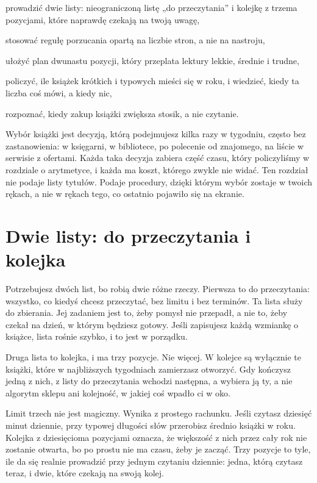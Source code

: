 
\begin{cele}
  \item prowadzić dwie listy: nieograniczoną listę „do przeczytania” i kolejkę z trzema pozycjami, które naprawdę czekają na twoją uwagę,
  \item stosować regułę porzucania opartą na liczbie stron, a nie na nastroju,
  \item ułożyć plan dwunastu pozycji, który przeplata lektury lekkie, średnie i trudne,
  \item policzyć, ile książek krótkich i typowych mieści się w roku, i wiedzieć, kiedy ta liczba coś mówi, a kiedy nic,
  \item rozpoznać, kiedy zakup książki zwiększa stosik, a nie czytanie.
\end{cele}

Wybór książki jest decyzją, którą podejmujesz kilka razy w tygodniu, często bez zastanowienia: w księgarni, w bibliotece, po polecenie od znajomego, na liście w serwisie z ofertami. Każda taka decyzja zabiera część czasu, który policzyliśmy w rozdziale o arytmetyce, i każda ma koszt, którego zwykle nie widać. Ten rozdział nie podaje listy tytułów. Podaje procedury, dzięki którym wybór zostaje w twoich rękach, a nie w rękach tego, co ostatnio pojawiło się na ekranie.

\section{Dwie listy: do przeczytania i kolejka}

Potrzebujesz dwóch list, bo robią dwie różne rzeczy. Pierwsza to \glqq do przeczytania\grqq{}: wszystko, co kiedyś chcesz przeczytać, bez limitu i bez terminów. Ta lista służy do zbierania. Jej zadaniem jest to, żeby pomysł nie przepadł, a nie to, żeby czekał na dzień, w którym będziesz gotowy. Jeśli zapisujesz każdą wzmiankę o książce, lista rośnie szybko, i to jest w porządku.

Druga lista to kolejka, i ma trzy pozycje. Nie więcej. W kolejce są wyłącznie te książki, które w najbliższych tygodniach zamierzasz otworzyć. Gdy kończysz jedną z nich, z listy do przeczytania wchodzi następna, a wybiera ją ty, a nie algorytm sklepu ani kolejność, w jakiej coś wpadło ci w oko.

Limit trzech nie jest magiczny. Wynika z prostego rachunku. Jeśli czytasz dziesięć minut dziennie, przy typowej długości  słów przerobisz średnio  książki w roku. Kolejka z dziesięcioma pozycjami oznacza, że większość z nich przez cały rok nie zostanie otwarta, bo po prostu nie ma czasu, żeby je zacząć. Trzy pozycje to tyle, ile da się realnie prowadzić przy jednym czytaniu dziennie: jedna, którą czytasz teraz, i dwie, które czekają na swoją kolej.

